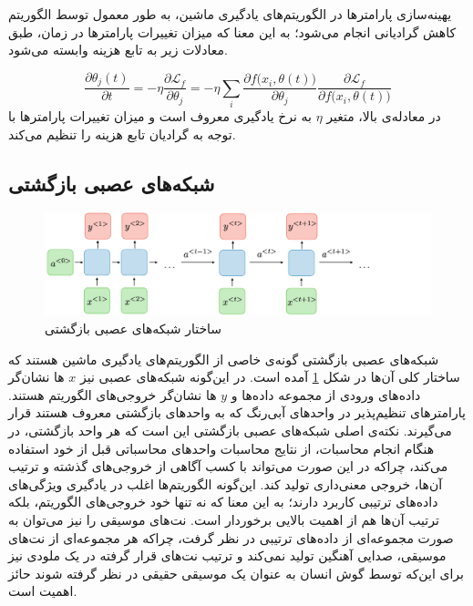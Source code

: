 یهینه‌سازی پارامترها در الگوریتم‌های یادگیری ماشین، به طور معمول توسط الگوریتم کاهش گرادیانی
انجام می‌شود؛ به این معنا که میزان تغییرات پارامترها در زمان، طبق معادلات زیر به تابع هزینه وابسته می‌شود.

\begin{equation}
    \frac{\partial \theta_j(t)}{\partial t} = - \eta \frac{\partial \mathcal{L}_f}{\partial \theta_j}
    = - \eta \sum_i \frac{\partial f \big(x_i, \theta (t)\big)}{\partial \theta_j} \frac{\partial \mathcal{L}_f}{\partial f \big(x_i, \theta(t)\big)}
\end{equation}
در معادله‌ی بالا، متغیر
$\eta$
به نرخ یادگیری 
معروف است و میزان تغییرات پارامترها با توجه به گرادیان تابع هزینه را تنظیم می‌کند.


\subsection{
شبکه‌های عصبی بازگشتی
\protect{}
}

\begin{figure}
	\centering
	\includegraphics[scale=0.35]{figures/architecture-rnn.png}
	\caption [
	ساختار شبکه‌های عصبی بازگشتی
	]{
	ساختار شبکه‌های عصبی بازگشتی 
	\cite{rnncheat}
	}
	\label{fig:rnnarch}
\end{figure}

شبکه‌های عصبی بازگشتی
گونه‌ی خاصی از الگوریتم‌های یادگیری ماشین هستند که ساختار کلی آن‌ها در شکل
\ref{fig:rnnarch}
آمده است.
در این‌گونه شبکه‌های عصبی نیز
$x$
ها نشان‌گر داده‌های ورودی از مجموعه داده‌ها و
$y$
ها نشان‌گر خروجی‌های الگوریتم هستند.
پارامترهای تنظیم‌پذیر در واحد‌های آبی‌رنگ که به 
واحد‌های بازگشتی
معروف هستند قرار می‌گیرند.
نکته‌ی اصلی شبکه‌های عصبی بازگشتی این است که هر واحد بازگشتی، در هنگام انجام محاسبات، از نتایج محاسبات واحد‌های محاسباتی قبل از خود استفاده می‌کند، چراکه در این صورت می‌تواند با کسب آگاهی از خروجی‌های گذشته و ترتیب آن‌ها، خروجی معنی‌داری تولید کند.
این‌گونه الگوریتم‌ها اغلب در یادگیری ویژگی‌های داده‌های ترتیبی
کاربرد دارند؛ به این معنا که نه تنها خود خروجی‌های الگوریتم، بلکه ترتیب آن‌ها هم از اهمیت بالایی برخوردار است.
نت‌های موسیقی را نیز می‌توان به صورت مجموعه‌ای از داده‌های ترتیبی در نظر گرفت، چراکه هر مجموعه‌ای از نت‌های موسیقی، صدایی آهنگین تولید نمی‌کند و ترتیب نت‌های قرار گرفته در یک ملودی نیز برای این‌که توسط گوش انسان به عنوان یک موسیقی حقیقی در نظر گرفته شوند حائز اهمیت است.


